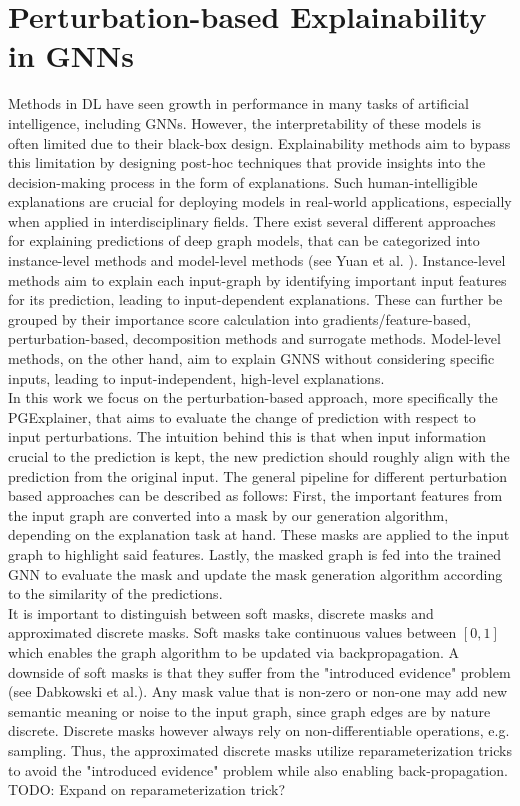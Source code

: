 \section{Perturbation-based Explainability in GNNs}
\label{sec:perturbation-based_explainability}
Methods in DL have seen growth in performance in many tasks of artificial intelligence, including GNNs. However, the interpretability of these models is often limited due to their black-box design. Explainability methods aim to bypass this limitation by designing post-hoc techniques that provide insights into the decision-making process in the form of explanations. Such human-intelligible explanations are crucial for deploying models in real-world applications, especially when applied in interdisciplinary fields. There exist several different approaches for explaining predictions of deep graph models, that can be categorized into instance-level methods and model-level methods (see Yuan et al. \cite{yuan2022explainability}). Instance-level methods aim to explain each input-graph by identifying important input features for its prediction, leading to input-dependent explanations. These can further be grouped by their importance score calculation into gradients/feature-based, perturbation-based, decomposition methods and surrogate methods. Model-level methods, on the other hand, aim to explain GNNS without considering specific inputs, leading to input-independent, high-level explanations. \\
In this work we focus on the perturbation-based approach, more specifically the PGExplainer\cite{luo2020parameterized}, that aims to evaluate the change of prediction with respect to input perturbations. The intuition behind this is that when input information crucial to the prediction is kept, the new prediction should roughly align with the prediction from the original input. The general pipeline for different perturbation based approaches can be described as follows: First, the important features from the input graph are converted into a mask by our generation algorithm, depending on the explanation task at hand. These masks are applied to the input graph to highlight said features. Lastly, the masked graph is fed into the trained GNN to evaluate the mask and update the mask generation algorithm according to the similarity of the predictions. \\
It is important to distinguish between soft masks, discrete masks and approximated discrete masks. Soft masks take continuous values between $[0,1]$ which enables the graph algorithm to be updated via backpropagation. A downside of soft masks is that they suffer from the "introduced evidence" problem (see Dabkowski et al.\cite{dabkowski2017real}). Any mask value that is non-zero or non-one may add new semantic meaning or noise to the input graph, since graph edges are by nature discrete. Discrete masks however always rely on non-differentiable operations, e.g. sampling. Thus, the approximated discrete masks utilize reparameterization tricks to avoid the "introduced evidence" problem while also enabling back-propagation. TODO: Expand on reparameterization trick?\\
